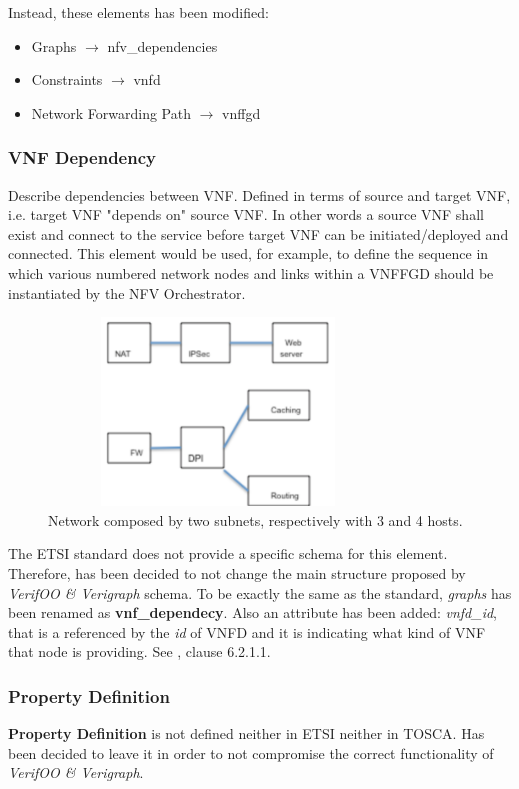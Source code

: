 \documentclass[11pt, english]{article}
\begin{document}
Instead, these elements has been modified:
\begin{itemize}
    \item Graphs $\rightarrow$ nfv\_dependencies
    \item Constraints $\rightarrow$ vnfd
    \item Network Forwarding Path $\rightarrow$ vnffgd
\end{itemize}

\subsubsection{VNF Dependency}
Describe dependencies between VNF. Defined in terms of source and target VNF, i.e. target VNF "depends on" source VNF. In other words a source VNF shall exist and connect to the service before target VNF can be initiated/deployed and connected. This element would be used, for example, to define the sequence in which various numbered network nodes and links within a VNFFGD should be instantiated by the NFV Orchestrator.

\begin{center}
    \begin{figure}[h!]
        \centering
        \includegraphics[width=9cm, height=5cm]{vnf_dependency.png}
        \caption{Network composed by two subnets, respectively with 3 and 4 hosts.} \label{Fig1}
    \end{figure}
\end{center}

The ETSI standard does not provide a specific schema for this element. Therefore, has been decided to not change the main structure proposed by \emph{VerifOO \& Verigraph} schema. To be exactly the same as the standard, \textit{graphs} has been renamed as \textbf{vnf\_dependecy}. Also an attribute has been added: \textit{vnfd\_id}, that is a referenced by the \textit{id} of VNFD and it is indicating what kind of VNF that node is providing. See \cite{etsi}, clause 6.2.1.1.

\newpage
\subsubsection{Property Definition}
\textbf{Property Definition} is not defined neither in ETSI neither in TOSCA. Has been decided to leave it in order to not compromise the correct functionality of \emph{VerifOO \& Verigraph}.
\end{document}
